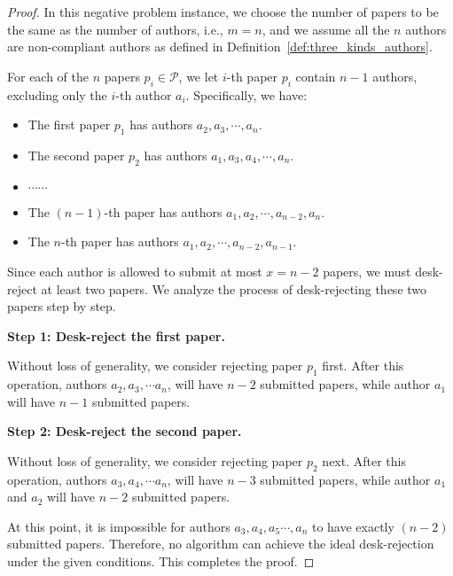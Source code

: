 \begin{proof}
In this negative problem instance, we choose the number of papers to be the same as the number of authors, i.e., $m=n$, and we assume all the $n$ authors are non-compliant authors as defined in Definition~\ref{def:three_kinds_authors}. 


For each of the $n$ papers $p_i \in \mathcal{P}$, we let $i$-th paper $p_i$ contain $n-1$ authors, excluding only the $i$-th author $a_i$. Specifically, we have:  
\begin{itemize}
    \item The first paper $p_1$ has authors $a_2, a_3, \cdots, a_n$. 
    \item The second paper $p_2$ has authors $a_1, a_3, a_4, \cdots, a_n$.
    \item $\cdots\cdots$
    \item The $(n-1)$-th paper has authors $a_1, a_2, \cdots , a_{n-2}, a_n$.
    \item The $n$-th paper has authors $a_1, a_2, \cdots , a_{n-2}, a_{n-1}$.
\end{itemize}

Since each author is allowed to submit at most $x=n-2$ papers, we must desk-reject at least two papers. We analyze the process of desk-rejecting these two papers step by step.


\textbf{Step 1: Desk-reject the first paper.}

Without loss of generality, we consider rejecting paper $p_1$ first. After this operation, authors $a_2, a_3, \cdots a_n$, will have $n-2$ submitted papers, while author $a_1$ will have $n-1$ submitted papers. 


\textbf{Step 2: Desk-reject the second paper.}

Without loss of generality, we consider rejecting paper $p_2$ next. After this operation, authors $a_3, a_4, \cdots a_n$, will have $n-3$ submitted papers, while author $a_1$ and $a_2$ will have $n-2$ submitted papers. 

At this point, it is impossible for authors $a_3, a_4, a_5 \cdots , a_n$ to have exactly $(n-2)$ submitted papers. Therefore, no algorithm can achieve the ideal desk-rejection under the given conditions. This completes the proof.
\end{proof}

